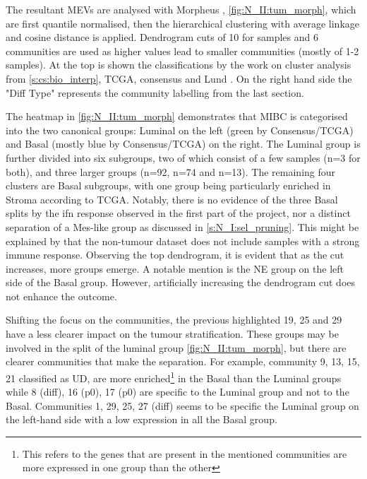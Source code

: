 The resultant MEVs are analysed with Morpheus \citep{Broad-Institute2016-tn}, \cref{fig:N_II:tum_morph}, which are first quantile normalised, then the hierarchical clustering with average linkage and cosine distance is applied. Dendrogram cuts of 10 for samples and 6 communities are used as higher values lead to smaller communities (mostly of 1-2 samples). At the top is shown the classifications by the work on cluster analysis from \cref{s:cs:bio_interp}, TCGA, consensus and Lund \citep{Robertson2017-mg,Kamoun2020-tj,Marzouka2018-ge}. On the right hand side the "Diff Type" represents the community labelling from the last section.

The heatmap in \cref{fig:N_II:tum_morph} demonstrates that MIBC is categorised into the two canonical groups: Luminal on the left (green by Consensus/TCGA) and Basal (mostly blue by Consensus/TCGA) on the right. The Luminal group is further divided into six subgroups, two of which consist of a few samples (n=3 for both), and three larger groups (n=92, n=74 and n=13). The remaining four clusters are Basal subgroups, with one group being particularly enriched in Stroma according to TCGA. Notably, there is no evidence of the three Basal splits by the \acrfull{ifn} response observed in the first part of the project, nor a distinct separation of a Mes-like group as discussed in \cref{s:N_I:sel_pruning}. This might be explained by that the non-tumour dataset does not include samples with a strong immune response. Observing the top dendrogram, it is evident that as the cut increases, more groups emerge. A notable mention is the NE group on the left side of the Basal group. However, artificially increasing the dendrogram cut does not enhance the outcome.

Shifting the focus on the communities, the previous highlighted 19, 25 and 29 have a less clearer impact on the tumour stratification. These groups may be involved in the split of the luminal group \cref{fig:N_II:tum_morph}, but there are clearer communities that make the separation. For example, community 9, 13, 15, 21 classified as UD, are more enriched\footnote{This refers to the genes that are present in the mentioned communities are more expressed in one group than the other} in the Basal than the Luminal groups while 8 (diff), 16 (p0), 17 (p0) are specific to the Luminal group and not to the Basal. Communities 1, 29, 25, 27 (diff) seems to be specific the Luminal group on the left-hand side with a low expression in all the Basal group. 

